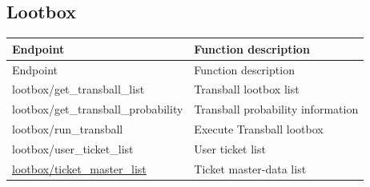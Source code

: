 \subsection{Lootbox}

\begin{longtable}{>{\ttfamily}p{}p{}}
\toprule
Endpoint & Function description \\
\midrule
\endfirsthead%

\toprule
Endpoint & Function description \\
\midrule
\endhead%

lootbox/get\_transball\_list
    & Transball lootbox list \\

lootbox/get\_transball\_probability
    & Transball probability information \\

lootbox/run\_transball
    & Execute Transball lootbox \\

lootbox/user\_ticket\_list
    & User ticket list \\

\hyperref[subsec:api_lootbox_ticket_master_list]
    {lootbox/ticket\_master\_list}
    & Ticket master-data list \\

\bottomrule
\end{longtable}